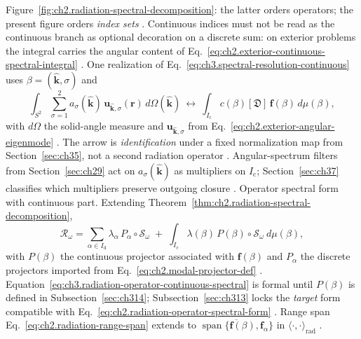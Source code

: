 Figure~\ref{fig:ch2.radiation-spectral-decomposition}: the latter orders operators; the present figure
orders \emph{index sets} \cite{stratton1941}. Continuous indices must not be read as the continuous
branch as optional decoration on a discrete sum: on exterior problems the integral carries the
angular content of Eq.~\eqref{eq:ch2.exterior-continuous-spectral-integral} \cite{jackson1999}.
One realization of Eq.~\eqref{eq:ch3.spectral-resolution-continuous} uses
\(\beta=(\hat{\mathbf{k}},\sigma)\) and
\begin{equation}
\label{eq:ch3.plane-wave-continuum-bridge}
\int_{S^{2}}\sum_{\sigma=1}^{2}
a_\sigma(\hat{\mathbf{k}})\,
\mathbf{u}_{\hat{\mathbf{k}},\sigma}(\mathbf{r})\,d\Omega(\hat{\mathbf{k}})
\ \longleftrightarrow\
\int_{I_{\mathrm{c}}}
c(\beta)[\mathfrak{D}]\,\mathbf{f}(\beta)\,d\mu(\beta),
\end{equation}
with \(d\Omega\) the solid-angle measure and \(\mathbf{u}_{\hat{\mathbf{k}},\sigma}\) from
Eq.~\eqref{eq:ch2.exterior-angular-eigenmode} \cite{stratton1941}. The arrow is
\emph{identification} under a fixed normalization map from Section~\ref{sec:ch35}, not a second
radiation operator \cite{harrington2001}. Angular-spectrum filters from Section~\ref{sec:ch29} act on
\(a_\sigma(\hat{\mathbf{k}})\) as multipliers on \(I_{\mathrm{c}}\); Section~\ref{sec:ch37} classifies
which multipliers preserve outgoing closure \cite{stratton1941}.
Operator spectral form with continuous part. Extending Theorem~\ref{thm:ch2.radiation-spectral-decomposition},
\begin{equation}
\label{eq:ch3.radiation-operator-continuous-spectral}
\mathcal{R}_\omega
=
\sum_{\alpha\in I_{\mathrm{d}}}
\lambda_\alpha\,P_\alpha\circ\mathcal{S}_\omega
\;+\;
\int_{I_{\mathrm{c}}}
\lambda(\beta)\,P(\beta)\circ\mathcal{S}_\omega\ d\mu(\beta),
\end{equation}
with \(P(\beta)\) the continuous projector associated with \(\mathbf{f}(\beta)\) and
\(P_\alpha\) the discrete projectors imported from Eq.~\eqref{eq:ch2.modal-projector-def}
\cite{stratton1941}. Equation~\eqref{eq:ch3.radiation-operator-continuous-spectral}
is formal until \(P(\beta)\) is defined in Subsection~\ref{sec:ch314}; Subsection~\ref{sec:ch313}
locks the \emph{target} form compatible with Eq.~\eqref{eq:ch2.radiation-operator-spectral-form}
\cite{stratton1941}. Range span Eq.~\eqref{eq:ch2.radiation-range-span} extends to
\(\overline{\operatorname{span}\{\mathbf{f}(\beta),\mathbf{f}_\alpha\}}\) in
\(\langle\cdot,\cdot\rangle_{\mathrm{rad}}\) \cite{harrington2001}.
